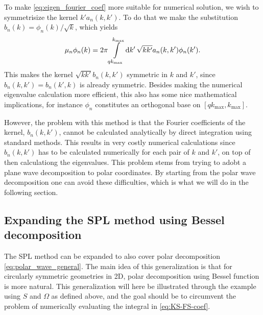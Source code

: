 \documentclass[11pt,a4paper, 
swedish,english %
]{article}
\begin{document}
To make
\eqref{eq:eigen_fourier_coef} more suitable for numerical solution,
we wish to symmetrisize the kernel $k'a_n(k, k')$. To do that we
make the substitution $b_n(k)=\phi_n(k)/\sqrt{k}$, which yields
\begin{equation}\label{eq:eig-n}
\mu_n \phi_n(k) = 2\pi\int_{qk_{\max}}^{k_{\max}}\rd{k'}\,
\sqrt{kk'}a_n(k, k') \phi_n(k').
\end{equation}
This makes the kernel $\sqrt{kk'}b_n(k, k')$ symmetric in $k$ and
$k'$, since $b_n(k, k')=b_n(k', k)$ is already symmetric. Besides
making the numerical eigenvalue calculation more efficient, this also
has some nice mathematical implications, for instance $\phi_n$
constitutes an orthogonal base on $[qk_{\max}, k_{\max}]$.

However, the problem with this method is that the Fourier coefficients
of the kernel, $b_n(k, k')$, cannot be calculated analytically by
direct integration using standard methods. This results in very costly
numerical calculations since $b_n(k, k')$ has to be calculated
numerically for each pair of $k$ and $k'$, on top of then calculationg
the eigenvalues. 
This problem stems from trying to adobt a plane wave decomposition to
polar coordinates. By starting from the polar wave decomposition one
can avoid these difficulties, which is what we will do in the
following section. 


\subsection{Expanding the SPL method using Bessel decomposition}
The SPL method can be expanded to also cover polar decomposition
\eqref{eq:polar_wave_general}. The main idea of this generalization is
that for circularly symmetric geometries in 2D, polar decomposition
using Bessel function is more natural. 
This generalization will here be illustrated through the example using
$S$ and $\Omega$ as defined above, and the goal should be to
circumvent the problem of numerically evaluating the integral in 
\eqref{eq:KS-FS-coef}.
\end{document}
